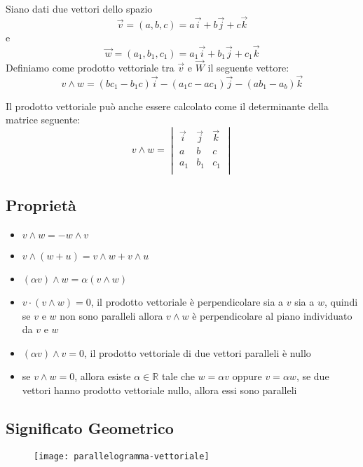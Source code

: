 \begin{definition}
Siano dati due vettori dello spazio $$\vec{v} = (a,b,c) = a\vec{i}+b\vec{j}+c\vec{k}$$
e
$$\vec{w} = (a_1,b_1,c_1) = a_1\vec{i}+b_1\vec{j}+c_1\vec{k}$$
Definiamo come prodotto vettoriale tra $\vec{v}$ e $\vec{W}$ il seguente vettore:
$$v \wedge w = (bc_1-b_1c)\vec{i}-(a_1c-ac_1)\vec{j}-(ab_1-a_b)\vec{k}$$
\end{definition}

Il prodotto vettoriale può anche essere calcolato come il determinante della matrice seguente:
$$
v \wedge w =
\begin{vmatrix}
    \vec{i} & \vec{j} & \vec{k} \\
    a       & b       & c       \\
    a_1     & b_1     & c_1     \\
\end{vmatrix}
$$

\subsection{Proprietà}

\begin{itemize}
\item $v \wedge w = -w \wedge v$
\item $v \wedge (w+u) = v \wedge w + v \wedge u$
\item $(\alpha v) \wedge w = \alpha(v \wedge w)$
\item $v \cdot (v \wedge w) = 0$, il prodotto vettoriale è perpendicolare sia a $v$ sia a $w$, quindi se $v$ e $w$ non sono paralleli allora $v \wedge w$ è perpendicolare al piano individuato da $v$ e $w$
\item $(\alpha v) \wedge v = 0$, il prodotto vettoriale di due vettori paralleli è nullo
\item se $ v \wedge w = 0$, allora esiste $\alpha \in \mathbb{R}$ tale che $w = \alpha v$ oppure $v = \alpha w$, se due vettori hanno prodotto vettoriale nullo, allora essi sono paralleli
\end{itemize}

\subsection{Significato Geometrico}

\begin{figure}[H]
\texttt{[image: parallelogramma-vettoriale]}
\centering
\end{figure}

